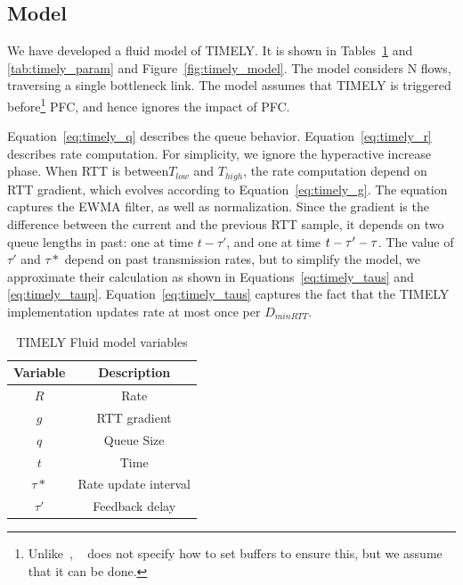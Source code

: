 \subsection{Model}

We have developed a fluid model of TIMELY. It is shown in
Tables~\ref{tab:timely_var} and \ref{tab:timely_param} and
Figure~\ref{fig:timely_model}.  The model considers N flows, traversing a single
bottleneck link. The model assumes that TIMELY is triggered
before\footnote{Unlike~\cite{dcqcn}, ~\cite{timely} does not specify how to set
buffers to ensure this, but we assume that it can be done.} PFC, and hence
ignores the impact of PFC.

Equation~\ref{eq:timely_q} describes the queue behavior.
Equation~\ref{eq:timely_r} describes rate computation. For simplicity, we ignore
the hyperactive increase phase. When RTT is between$T_{low}$ and $T_{high}$, the
rate computation depend on RTT gradient, which evolves according to
Equation~\ref{eq:timely_g}.  The equation captures the EWMA filter, as well as
normalization. Since the gradient is the difference between the current and the
previous RTT sample, it depends on two queue lengths in past: one at time $t -
\tau'$, and one at time $t - \tau'-\tau\*$. The value of $\tau'$ and $\tau*$
depend on past transmission rates, but to simplify the model, we approximate
their calculation as shown in Equations~\ref{eq:timely_taus} and
\ref{eq:timely_taup}.  Equation~\ref{eq:timely_taus} captures the fact that the
TIMELY implementation updates rate at most once per $D_{minRTT}$.

\begin{table}[t]
\center
{
\footnotesize
{
\begin{tabular}{|c|c|} \hline
Variable & Description \\ \hline
$R$ & Rate \\ \hline
$g$ & RTT gradient\\ \hline
$q$ & Queue Size \\ \hline
$t$ & Time \\ \hline
$\tau*$ & Rate update interval \\ \hline
$\tau'$ & Feedback delay \\ \hline
\end{tabular}
}
}
\caption{TIMELY Fluid model variables}
\label{tab:timely_var}
\end{table}

